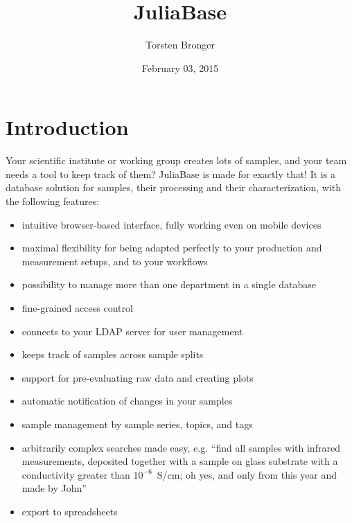 \documentclass[a4paper,11pt,english]{sphinxmanual}
\title{JuliaBase}
\date{February 03, 2015}
\author{Torsten Bronger}
\begin{document}
\maketitle
\tableofcontents
{}\label{toc::doc}



\chapter{Introduction}
\label{index:introduction}\label{index::doc}\label{index:juliabase}
Your scientific institute or working group creates lots of samples, and your
team needs a tool to keep track of them?  JuliaBase is made for exactly that!
It is a database solution for samples, their processing and their
characterization, with the following features:
\begin{itemize}
\item {} 
intuitive browser-based interface, fully working even on mobile devices

\item {} 
maximal flexibility for being adapted perfectly to your production and
measurement setups, and to your workflows

\item {} 
possibility to manage more than one department in a single database

\item {} 
fine-grained access control

\item {} 
connects to your LDAP server for user management

\item {} 
keeps track of samples across sample splits

\item {} 
support for pre-evaluating raw data and creating plots

\item {} 
automatic notification of changes in your samples

\item {} 
sample management by sample series, topics, and tags

\item {} 
arbitrarily complex searches made easy, e.g. “find all samples with infrared
measurements, deposited together with a sample on glass substrate with a
conductivity greater than \(10^{-6}\) S/cm; oh yes, and only from this year and made
by John”

\item {} 
export to spreadsheets


\end{itemize}
\end{document}
